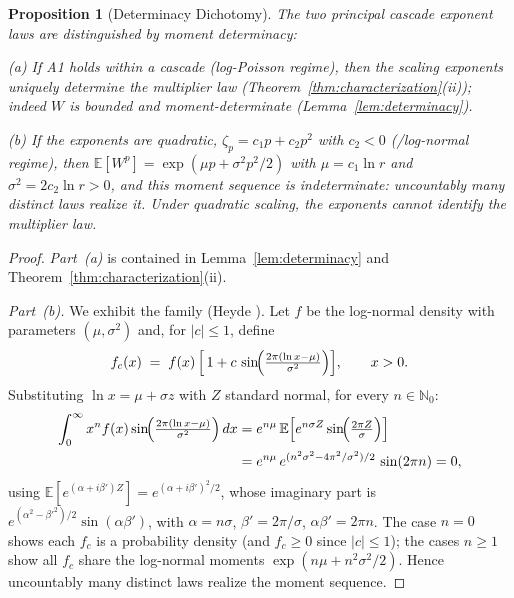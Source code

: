 \documentclass[pdflatex,sn-mathphys-num]{sn-jnl}
\theoremstyle{thmstyleone}
\newtheorem{proposition}[theorem]{Proposition}
\theoremstyle{thmstyletwo}
\theoremstyle{thmstylethree}
\begin{document}
\begin{proposition}[Determinacy Dichotomy]\label{prop:determinacy}
The two principal cascade exponent laws are distinguished by moment
determinacy:

\textup{(a)} If A1 holds within a cascade (log-Poisson regime), then
the scaling exponents uniquely determine the multiplier law
(Theorem~\textup{\ref{thm:characterization}(ii)}); indeed $W$ is
bounded and moment-determinate
(Lemma~\textup{\ref{lem:determinacy}}).

\textup{(b)} If the exponents are quadratic, $\zeta_p = c_1 p +
c_2 p^2$ with $c_2 < 0$ (\textup{\cite{K62}}/log-normal regime),
then $\mathbb{E}[W^p] = \exp(\mu p + \sigma^2 p^2/2)$ with $\mu =
c_1\ln r$ and $\sigma^2 = 2c_2\ln r > 0$, and this moment sequence is
indeterminate: uncountably many distinct laws realize it.  Under
quadratic scaling, the exponents cannot identify the multiplier law.
\end{proposition}

\begin{proof}
\textit{Part~\textup{(a)}} is contained in
Lemma~\ref{lem:determinacy} and
Theorem~\ref{thm:characterization}(ii).

\textit{Part~\textup{(b)}.}  We exhibit the family (Heyde
\cite{Hey63}).  Let $f$ be the log-normal density with parameters
$(\mu, \sigma^2)$ and, for $|c| \le 1$, define
\[
  f_c(x) \;=\; f(x)\,\Bigl[\,1 + c\,
  \sin\!\Bigl(\tfrac{2\pi(\ln x - \mu)}{\sigma^2}\Bigr)\Bigr],
  \qquad x > 0 .
\]
Substituting $\ln x = \mu + \sigma z$ with $Z$ standard normal, for
every $n \in \mathbb{N}_0$:
\[
\begin{aligned}
  \int_0^\infty x^n f(x)
  \sin\!\Bigl(\tfrac{2\pi(\ln x-\mu)}{\sigma^2}\Bigr)\,dx
  &= e^{n\mu}\,\mathbb{E}\Bigl[e^{n\sigma Z}
    \sin\!\Bigl(\tfrac{2\pi Z}{\sigma}\Bigr)\Bigr]\\
  &= e^{n\mu}\, e^{(n^2\sigma^2 - 4\pi^2/\sigma^2)/2}\,
    \sin(2\pi n) = 0,
\end{aligned}
\]
using $\mathbb{E}[e^{(\alpha+i\beta')Z}] = e^{(\alpha+i\beta')^2/2}$,
whose imaginary part is $e^{(\alpha^2-\beta'^2)/2}\allowbreak\sin(\alpha\beta')$,
with $\alpha = n\sigma$, $\beta' = 2\pi/\sigma$, $\alpha\beta' =
2\pi n$.  The case $n = 0$ shows each $f_c$ is a probability density
(and $f_c \ge 0$ since $|c| \le 1$); the cases $n \ge 1$ show all
$f_c$ share the log-normal moments $\exp(n\mu + n^2\sigma^2/2)$.
Hence uncountably many distinct laws realize the moment sequence.
\end{proof}
\end{document}
